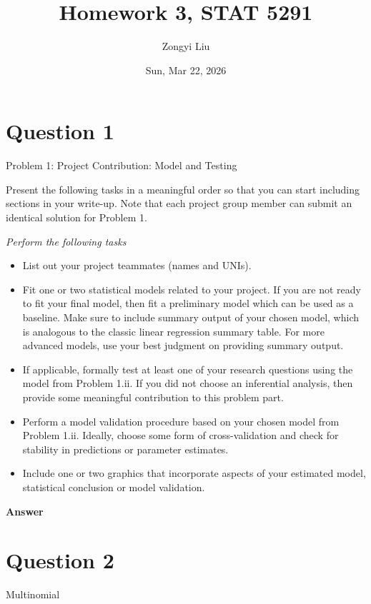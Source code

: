 \documentclass[letterpaper]{article}
\title{Homework 3, STAT 5291}
\author{Zongyi Liu}
\date{Sun, Mar 22, 2026}
\begin{document}
		\maketitle
		
		\section{Question 1}
		
		{\color{deepred} Problem 1: Project Contribution: Model and Testing}
		
		Present the following tasks in a meaningful order so that you can start including sections in your write-up. Note that each project group member can submit an identical solution for Problem 1.
		
		\emph{Perform the following tasks}
		\begin{itemize}
			\item[(i)] List out your project teammates (names and UNIs).
			\item[(ii)] Fit one or two statistical models related to your project. If you are not ready to fit your final model, then fit a preliminary model which can be used as a baseline. Make sure to include summary output of your chosen model, which is analogous to the classic linear regression summary table. For more advanced models, use your best judgment on providing summary output.
			\item[(iii)] If applicable, formally test at least one of your research questions using the model from Problem 1.ii. If you did not choose an inferential analysis, then provide some meaningful contribution to this problem part.
			\item[(iv)] Perform a model validation procedure based on your chosen model from Problem 1.ii. Ideally, choose some form of cross-validation and check for stability in predictions or parameter estimates.
			\item[(v)] Include one or two graphics that incorporate aspects of your estimated model, statistical conclusion or model validation.
		\end{itemize}
	
	\textbf{Answer}
	
	\clearpage
	
	\section{Question 2}
	
	{\color{deepred}  Multinomial}
	
\end{document}
